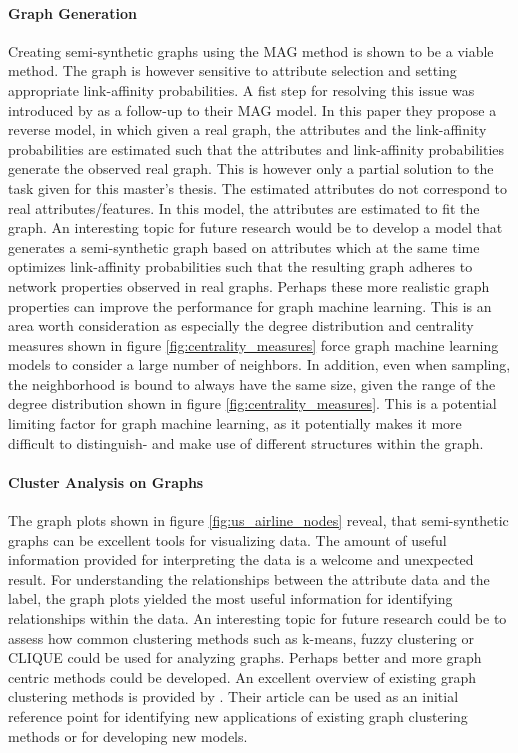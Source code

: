   \paragraph{Graph Generation} \mbox{}
  
  \noindent Creating semi-synthetic graphs using the MAG method is shown to be a 
  viable method. The graph is however sensitive to attribute selection and 
  setting appropriate link-affinity probabilities. A fist step for resolving
  this issue was introduced by \cite{kim2011modeling} as a follow-up to their
  MAG model. In this paper they propose a reverse model, in which given a real
  graph, the attributes and the link-affinity probabilities are estimated such 
  that the attributes and link-affinity probabilities generate the observed real
  graph. This is however only a partial solution to the task given for this
  master's thesis. The estimated attributes do not correspond to real 
  attributes/features. In this model, the attributes are estimated to fit the 
  graph. An interesting topic for future research would be to develop a model 
  that generates a semi-synthetic graph based on attributes which at the same
  time optimizes link-affinity probabilities such that the resulting graph
  adheres to network properties observed in real graphs. Perhaps these more
  realistic graph properties can improve the performance for graph machine
  learning. This is an area worth consideration as especially the degree
  distribution and centrality measures shown in figure 
  \ref{fig:centrality_measures} force graph machine learning models to consider
  a large number of neighbors. In addition, even when sampling, the
  neighborhood is bound to always have the same size, given the range of the
  degree distribution shown in figure \ref{fig:centrality_measures}. This is a
  potential limiting factor for graph machine learning, as it potentially makes
  it more difficult to distinguish- and make use of different structures
  within the graph.

  \paragraph{Cluster Analysis on Graphs} \mbox{}

  \noindent The graph plots shown in figure \ref{fig:us_airline_nodes} reveal,
  that semi-synthetic graphs can be excellent tools for visualizing data. The
  amount of useful information provided for interpreting the data is a welcome
  and unexpected result. For understanding the relationships between the
  attribute data and the label, the graph plots yielded the most useful
  information for identifying relationships within the data. An interesting
  topic for future research could be to assess how common clustering methods
  such as k-means, fuzzy clustering or CLIQUE could be used for analyzing
  graphs. Perhaps better and more graph centric methods could be developed. An
  excellent overview of existing graph clustering methods is provided by
  \cite{zhou2020graph}. Their article can be used as an initial reference point
  for identifying new applications of existing graph clustering methods or for 
  developing new models.

